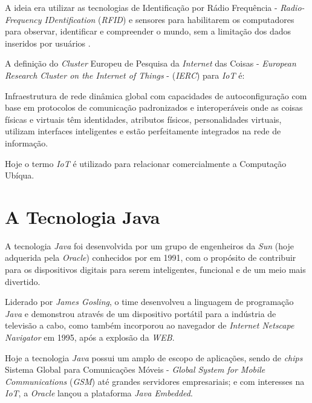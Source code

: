 A ideia era utilizar as tecnologias de Identificação por Rádio Frequência -
\textit{Radio-Frequency IDentification} (\textit{RFID}) e sensores para
habilitarem os computadores para observar, identificar e compreender o mundo,
sem a limitação dos dados inseridos por usuários \cite{kevinashton2009}.

\newpage
A definição do \textit{Cluster} Europeu de Pesquisa da \textit{Internet} das
Coisas - \textit{European Research Cluster on the Internet of Things} -
(\textit{IERC}) \cite[p. ~26]{iangsmith2012} para \textit{IoT} é:

\begin{citacao}
    Infraestrutura de rede dinâmica global com capacidades de autoconfiguração
    com base em protocolos de comunicação padronizados e interoperáveis onde as
    coisas físicas e virtuais têm identidades, atributos físicos,
    personalidades virtuais, utilizam interfaces inteligentes e estão
    perfeitamente integrados na rede de informação.
\end{citacao}

Hoje o termo \textit{IoT} é utilizado para relacionar comercialmente a
Computação Ubíqua.

\section{A Tecnologia Java}

A tecnologia \textit{Java} foi desenvolvida por um grupo de engenheiros da
\textit{Sun} (hoje adquerida pela \textit{Oracle}) conhecidos por
 em 1991, com o propósito de contribuir para os
dispositivos digitais para serem inteligentes, funcional e de um meio mais
divertido.

Liderado por \textit{James Gosling}, o time desenvolveu a linguagem de
programação \textit{Java} e demonstrou através de um dispositivo portátil para
a indústria de televisão a cabo, como também incorporou ao navegador de
\textit{Internet Netscape Navigator} em 1995, após a explosão da \textit{WEB}.

Hoje a tecnologia \textit{Java} possui um amplo de escopo de aplicações, sendo
de \textit{chips} Sistema Global para Comunicações Móveis - \textit{Global
  System for Mobile Communications} (\textit{GSM}) até grandes servidores
empresariais; e com interesses na \textit{IoT}, a \textit{Oracle} lançou a
plataforma \textit{Java Embedded}.
